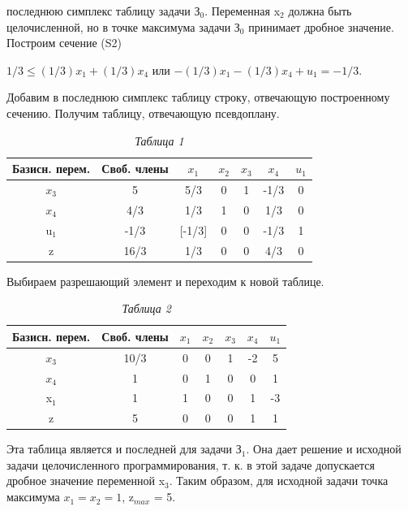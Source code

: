 { последнюю симплекс таблицу задачи З$_0$. Переменная x$_2$ должна быть целочисленной, но в точке максимума задачи З$_0$ принимает дробное значение. Построим сечение (S2)
\begin{center}
$1/3 \leq (1/3)  x_1 + (1/3) x_4$ или $-(1/3) x_1 - (1/3) x_4 + u_1 = -1/3.$
\end{center}

Добавим в последнюю симплекс таблицу строку, отвечающую построенному сечению. Получим таблицу, отвечающую псевдоплану.
\begin{table}[h!]
\label{table_5_15}
\caption*{\hspace{0.8\linewidth} \textit{Таблица 1}}
\centering
\begin{tabular}{|c|*{6}{c|}}
\hline
\parbox{1.9cm}{\centering Базисн. перем.}& \parbox{1.9cm}{\centering Своб. члены} & \parbox{1cm}{\centering $x_1$} & \parbox{1cm}{\centering $x_2$} & \parbox{1cm}{\centering $x_3$} & \parbox{1cm}{\centering $x_4$} & \parbox{1cm}{\centering $u_1$}\\
\hline
$x_3$ & 5 & 5/3 & 0 & 1 & -1/3 & 0\\
\hline
$x_4 $ & 4/3 & 1/3 & 1 & 0 & 1/3 & 0 \\
\hline
{}u$_1$ & -1/3 & [-1/3] & 0 & 0 & -1/3 & 1\\
\hline
z & 16/3 & 1/3 & 0 & 0 & 4/3 & 0\\
\hline
\end{tabular}
\end{table}

Выбираем разрешающий элемент и переходим к новой таблице.
\newpage
\begin{table}[h!]
\label{table_5_16}
\caption*{\hspace{0.8\linewidth} \textit{Таблица 2}}
\centering
\begin{tabular}{|c|*{6}{c|}}
\hline
\parbox{1.9cm}{\centering Базисн. перем.}& \parbox{1.9cm}{\centering Своб. члены} & \parbox{1cm}{\centering $x_1$} & \parbox{1cm}{\centering $x_2$} & \parbox{1cm}{\centering $x_3$} & \parbox{1cm}{\centering $x_4$} & \parbox{1cm}{\centering $u_1$}\\
\hline
$x_3$ & 10/3 & 0 & 0 & 1 & -2 & 5\\
\hline
$x_4 $ & 1 & 0 & 1 & 0 & 0 & 1 \\
\hline
x$_1$ & 1 & 1 & 0 & 0 & 1 & -3\\
\hline
z & 5 & 0 & 0 & 0 & 1 & 1\\
\hline
\end{tabular}
\end{table}

Эта таблица является и последней для задачи З$_1$. Она дает решение и исходной задачи целочисленного программирования, т. к. в этой задаче допускается дробное значение переменной x$_3$. Таким образом, для исходной задачи точка максимума $x_1 = x_2 = 1$,  z$_{max}$ = 5.}

